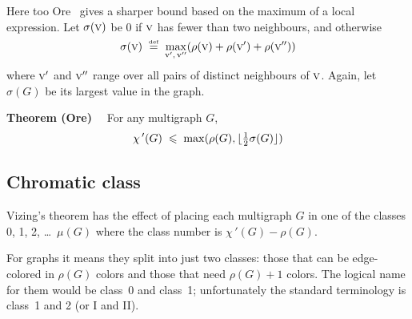 \documentclass[12pt]{article}
\let\le\leqslant
\let\T\textstyle
\let\S\scriptstyle
\let\SS\scriptscriptstyle
\def\frac#1#2{\mathord{\mathchoice%
{\T{#1\over#2}}
{\T{#1\over#2}}
{\S{#1\over#2}}
{\SS{#1\over#2}}}}
\def\isdef{\mathrel{\mathop{=}\limits^{\smash{\hbox{\tiny def}}}}}
\def\0#1{\hbox{\sc #1}}  %
\begin{document}
Here too Ore~\cite{Ore67} gives a sharper bound based on the maximum of
a local expression. Let $\sigma(\0v)$ be 0 if $\0v$ has fewer than two
neighbours, and otherwise
$$
  \sigma(\0v) \;\isdef\;
  \max_{{\rm v}',\,{\rm v}''} (\rho(\0v) + \rho(\0v') + \rho(\0v''))
$$
where $\0v'$ and $\0v''$ range over all pairs of distinct neighbours of $\0v$. Again, let $\sigma(G)$ be its
largest value in the graph.

{\bf Theorem (Ore)}$\quad$ For any multigraph $G$,
$$
  {\chi\,}'(G) \;\le\; \max(\rho(G),\lfloor\frac12\sigma(G)\rfloor)
$$

\subsection*{Chromatic class}

Vizing's theorem has the effect of placing each multigraph $G$ in one of the
classes 0, 1, 2, \dots\ $\mu(G)$ where the class number is
${\chi\,}'(G)-\rho(G)$.

For graphs it means they split into just two classes: those that can be
edge-colored in $\rho(G)$ colors and those that need $\rho(G)+1$
colors. The logical name for them would be class~0 and class~1; unfortunately
the standard terminology is class~1 and 2 (or I and II).
\end{document}
